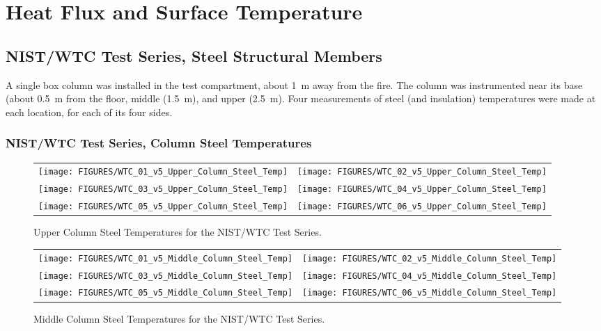 \chapter{Heat Flux and Surface Temperature}



\clearpage

\section{NIST/WTC Test Series, Steel Structural Members}

A single box column was installed in the test compartment, about 1~m away from the fire. The column was instrumented near its base (about
0.5~m from the floor, middle (1.5~m), and upper (2.5~m). Four measurements of steel (and insulation) temperatures were made at each location, for
each of its four sides.

\clearpage

\subsection{NIST/WTC Test Series, Column Steel Temperatures}

\vspace{1in}

\begin{figure}[h!]
\begin{tabular*}{\textwidth}{l@{\extracolsep{\fill}}r}
\texttt{[image: FIGURES/WTC\_01\_v5\_Upper\_Column\_Steel\_Temp]} &
\texttt{[image: FIGURES/WTC\_02\_v5\_Upper\_Column\_Steel\_Temp]} \\
\texttt{[image: FIGURES/WTC\_03\_v5\_Upper\_Column\_Steel\_Temp]} &
\texttt{[image: FIGURES/WTC\_04\_v5\_Upper\_Column\_Steel\_Temp]} \\
\texttt{[image: FIGURES/WTC\_05\_v5\_Upper\_Column\_Steel\_Temp]} &
\texttt{[image: FIGURES/WTC\_06\_v5\_Upper\_Column\_Steel\_Temp]}
\end{tabular*}
\caption{Upper Column Steel Temperatures for the NIST/WTC Test Series.}
\label{NIST_WTC_Upper_Column_Steel}
\end{figure}

\begin{figure}[p]
\begin{tabular*}{\textwidth}{l@{\extracolsep{\fill}}r}
\texttt{[image: FIGURES/WTC\_01\_v5\_Middle\_Column\_Steel\_Temp]} &
\texttt{[image: FIGURES/WTC\_02\_v5\_Middle\_Column\_Steel\_Temp]} \\
\texttt{[image: FIGURES/WTC\_03\_v5\_Middle\_Column\_Steel\_Temp]} &
\texttt{[image: FIGURES/WTC\_04\_v5\_Middle\_Column\_Steel\_Temp]} \\
\texttt{[image: FIGURES/WTC\_05\_v5\_Middle\_Column\_Steel\_Temp]} &
\texttt{[image: FIGURES/WTC\_06\_v5\_Middle\_Column\_Steel\_Temp]}
\end{tabular*}
\caption{Middle Column Steel Temperatures for the NIST/WTC Test Series.}
\label{NIST_WTC_Middle_Column_Steel}
\end{figure}

